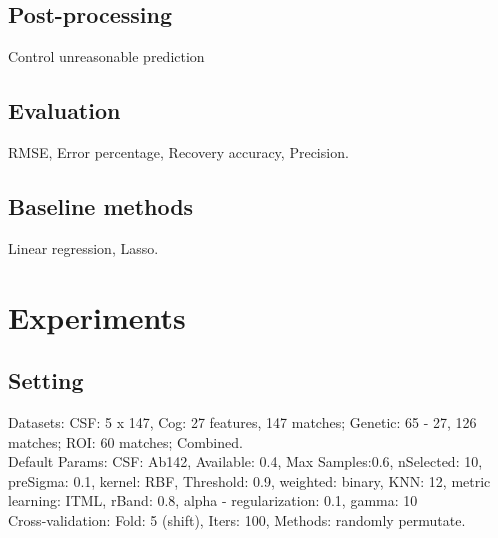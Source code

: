 \documentclass{article}
\theoremstyle{definition}
\begin{document}
\subsection{Post-processing}
Control unreasonable prediction

\subsection{Evaluation} 
RMSE, Error percentage, Recovery accuracy, Precision.

\subsection{Baseline methods}
Linear regression, Lasso.

\newpage
\section{Experiments}

\subsection{Setting}
 Datasets: CSF: 5 x 147, Cog: 27 features, 147 matches; Genetic: 65 - 27, 126 matches; ROI: 60 matches; Combined. \\
Default Params: CSF: Ab142, Available: 0.4, Max Samples:0.6, nSelected: 10, preSigma: 0.1, kernel: RBF, Threshold: 0.9, weighted: binary, KNN: 12, metric learning: ITML, rBand: 0.8, alpha - regularization: 0.1, gamma: 10 \\
Cross-validation: Fold: 5 (shift), Iters: 100, Methods: randomly permutate.
\end{document}
